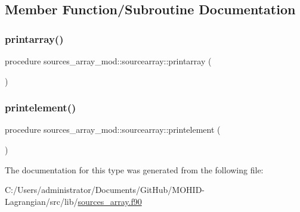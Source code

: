 \subsection{Member Function/\+Subroutine Documentation}
\mbox{\label{structsources__array__mod_1_1sourcearray_a4200722231b4dfefa4f096b235d911e6}} 
\subsubsection{\texorpdfstring{printarray()}{printarray()}}
{\footnotesize\ttfamily procedure sources\+\_\+array\+\_\+mod\+::sourcearray\+::printarray (\begin{DoxyParamCaption}{ }\end{DoxyParamCaption})\hspace{0.3cm}{\ttfamily [private]}}

\mbox{\label{structsources__array__mod_1_1sourcearray_a72a537b29e5b5cf3ba35745cb7b41524}} 
\subsubsection{\texorpdfstring{printelement()}{printelement()}}
{\footnotesize\ttfamily procedure sources\+\_\+array\+\_\+mod\+::sourcearray\+::printelement (\begin{DoxyParamCaption}{ }\end{DoxyParamCaption})\hspace{0.3cm}{\ttfamily [private]}}



The documentation for this type was generated from the following file\+:\begin{DoxyCompactItemize}
\item 
C\+:/\+Users/administrator/\+Documents/\+Git\+Hub/\+M\+O\+H\+I\+D-\/\+Lagrangian/src/lib/\hyperlink{sources__array_8f90}{sources\+\_\+array.\+f90}\end{DoxyCompactItemize}
